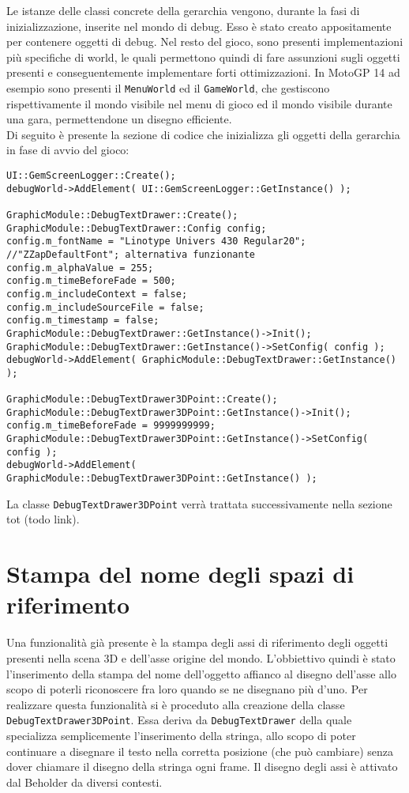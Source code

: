 Le istanze delle classi concrete della gerarchia vengono, durante la fasi di inizializzazione, inserite nel mondo di debug. Esso è stato creato appositamente per contenere oggetti di debug. Nel resto del gioco, sono presenti implementazioni più specifiche di world, le quali permettono quindi di fare assunzioni sugli oggetti presenti e conseguentemente implementare forti ottimizzazioni. In MotoGP 14 ad esempio sono presenti il \texttt{MenuWorld} ed il \texttt{GameWorld}, che gestiscono rispettivamente il mondo visibile nel menu di gioco ed il mondo visibile durante una gara, permettendone un disegno efficiente.\\

Di seguito è presente la sezione di codice che inizializza gli oggetti della gerarchia in fase di avvio del gioco:

\begin{lstlisting}[style=maurizio-code]
UI::GemScreenLogger::Create();
debugWorld->AddElement( UI::GemScreenLogger::GetInstance() );

GraphicModule::DebugTextDrawer::Create();
GraphicModule::DebugTextDrawer::Config config;
config.m_fontName = "Linotype Univers 430 Regular20"; //"ZZapDefaultFont"; alternativa funzionante
config.m_alphaValue = 255;
config.m_timeBeforeFade = 500;
config.m_includeContext = false;
config.m_includeSourceFile = false;
config.m_timestamp = false;
GraphicModule::DebugTextDrawer::GetInstance()->Init();
GraphicModule::DebugTextDrawer::GetInstance()->SetConfig( config );
debugWorld->AddElement( GraphicModule::DebugTextDrawer::GetInstance() );

GraphicModule::DebugTextDrawer3DPoint::Create();
GraphicModule::DebugTextDrawer3DPoint::GetInstance()->Init();
config.m_timeBeforeFade = 9999999999;
GraphicModule::DebugTextDrawer3DPoint::GetInstance()->SetConfig( config );
debugWorld->AddElement( GraphicModule::DebugTextDrawer3DPoint::GetInstance() );
\end{lstlisting}

La classe \texttt{DebugTextDrawer3DPoint} verrà trattata successivamente nella sezione tot (todo link).\\

\section{Stampa del nome degli spazi di riferimento}

Una funzionalità già presente è la stampa degli assi di riferimento degli oggetti presenti nella scena 3D e dell'asse origine del mondo. L'obbiettivo quindi è stato l'inserimento della stampa del nome dell'oggetto affianco al disegno dell'asse allo scopo di poterli riconoscere fra loro quando se ne disegnano più d'uno. Per realizzare questa funzionalità si è proceduto alla creazione della classe \texttt{DebugTextDrawer3DPoint}. Essa deriva da \texttt{DebugTextDrawer} della quale specializza semplicemente l'inserimento della stringa, allo scopo di poter continuare a disegnare il testo nella corretta posizione (che può cambiare) senza dover chiamare il disegno della stringa ogni frame. Il disegno degli assi è attivato dal Beholder da diversi contesti.\\

